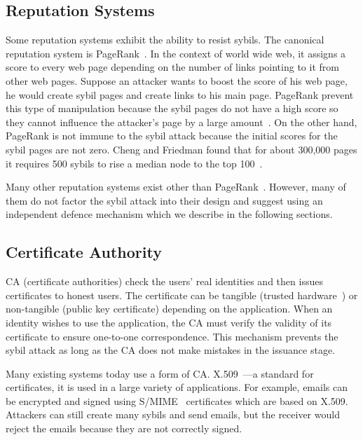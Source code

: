 \subsection{Reputation Systems}
Some reputation systems exhibit the ability to resist sybils. The canonical
reputation system is PageRank~\cite{page1999pagerank}. In the context of world
wide web, it assigns a score to every web page depending on the number of links
pointing to it from other web pages. Suppose an attacker wants to boost the
score of his web page, he would create sybil pages and create links to his main
page. PageRank prevent this type of manipulation because the sybil pages do not
have a high score so they cannot influence the attacker's page by a large
amount~\cite{baeza2005pagerank}. On the other hand, PageRank is not immune to
the sybil attack because the initial scores for the sybil pages are not zero.
Cheng and Friedman found that for about 300,000 pages it requires 500 sybils to
rise a median node to the top 100~\cite{cheng2006manipulability}.

Many other reputation systems exist other than
PageRank~\cite{kamvar2003eigentrust, srivatsa2005trustguard,
  nandi2005scrivener}. However, many of them do not factor the sybil attack into
their design and suggest using an independent defence mechanism which we
describe in the following sections.

\subsection{Certificate Authority}\label{sec:cert-authority}
CA (certificate authorities) check the users' real identities and then issues
certificates to honest users. The certificate can be tangible (trusted
hardware~\cite{newsome2004sybil}) or non-tangible (public key certificate)
depending on the application. When an identity wishes to use the application,
the CA must verify the validity of its certificate to ensure one-to-one
correspondence. This mechanism prevents the sybil attack as long as the CA does
not make mistakes in the issuance stage.

Many existing systems today use a form of CA.
X.509~\cite{housley2002internet}---a standard for certificates, it is used in a
large variety of applications. For example, emails can be encrypted and signed
using S/MIME~\cite{ramsdell2010secure} certificates which are based on X.509.
Attackers can still create many sybils and send emails, but the receiver would
reject the emails because they are not correctly signed.

